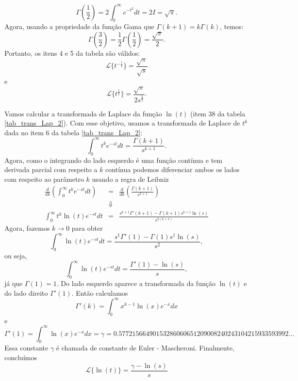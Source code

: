 \begin{ex}
\begin{equation}
\Gamma\left(\frac{1}{2}\right)=2\int_{0}^{\infty}e^{-t^2}dt=2I=\sqrt{\pi}.
\end{equation}
Agora, usando a propriedade da função Gama que $\Gamma(k+1)=k\Gamma(k)$, temos:
\begin{equation}
\Gamma\left(\frac{3}{2}\right)=\frac{1}{2}\Gamma\left(\frac{1}{2}\right)=\frac{\sqrt{\pi}}{2}.
\end{equation}
Portanto, os itens 4 e 5 da tabela são válidos:
\begin{equation}
 \mathcal{L}\{t^{-\frac{1}{2}}\}=\frac{\sqrt{\pi}}{\sqrt{s}}
\end{equation}
e
\begin{equation}
 \mathcal{L}\{t^{\frac{1}{2}}\}=\frac{\sqrt{\pi}}{2s^{\frac{3}{2}}}.
\end{equation}
 \end{ex}
\begin{ex}Vamos calcular a transformada de Laplace da função $\ln(t)$ (item 38 da tabela \ref{tab_trans_Lap_2}). Com esse objetivo, usamos a transformada de Laplace de $t^k$ dada no item 6 da tabela \ref{tab_trans_Lap_2}:
\begin{equation}
\int_0^\infty t^ke^{-st}dt=\frac{\Gamma(k+1)}{s^{k+1}}.
\end{equation}
Agora, como o integrando do lado esquerdo é uma função contínua e tem derivada parcial com respeito a $k$ contínua podemos diferenciar ambos os lados com respeito ao parâmetro $k$ usando a regra de Leibniz
\begin{eqnarray*}
\frac{d}{dk}\left(\int_0^\infty t^ke^{-st}dt\right)&=&\frac{d}{dk}\left(\frac{\Gamma(k+1)}{s^{k+1}}\right)\\
&\Downarrow&\\
\int_0^\infty t^k \ln(t) e^{-st}dt&=&\frac{s^{k+1}\Gamma'(k+1)-\Gamma(k+1)s^{k+1}\ln(s)}{s^{2(k+1)}}
\end{eqnarray*}
Agora, fazemos $k\to 0$ para obter
\begin{equation}
\int_0^\infty \ln(t) e^{-st}dt=\frac{s^{1}\Gamma'(1)-\Gamma(1)s^{1}\ln(s)}{s^{2}},
\end{equation}
ou seja,
\begin{equation}
\int_0^\infty \ln(t) e^{-st}dt=\frac{\Gamma'(1)-\ln(s)}{s},
\end{equation}
já que $\Gamma(1)=1$. Do lado esquerdo aparece a transformada da função $\ln(t)$ e do lado direito $\Gamma'(1)$. Então calculamos
\begin{equation}
\Gamma'(k)=\int_0^\infty x^{k-1}\ln(x) e^{-x}dx
\end{equation}
e
\begin{equation}
\Gamma'(1)=\int_0^\infty \ln(x) e^{-x} dx=\gamma=0.57721566490153286060651209008240243104215933593992 ...
\end{equation}
Essa constante $\gamma$ é chamada de constante de Euler - Mascheroni. Finalmente, concluímos
\begin{equation}
\mathcal{L}\{\ln(t)\}=\frac{\gamma-\ln(s)}{s}
\end{equation}
\end{ex}

